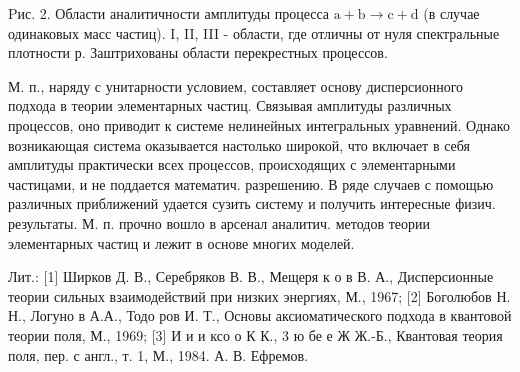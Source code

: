 \documentclass[10pt]{article}
\begin{document}
Pис. 2. Области аналитичности амплитуды процесса $\mathrm{a}+\mathrm{b} \rightarrow \mathrm{c}+\mathrm{d}$ (в случае одинаковых масс частиц). I, II, III - области, где отличны от нуля спектральные плотности р. Заштрихованы области перекрестных процессов.



М. п., наряду с унитарности условием, составляет основу дисперсионного подхода в теории элементарных частиц. Связывая амплитуды различных процессов, оно приводит к системе нелинейных интегральных уравнений. Однако возникающая система оказывается настолько широкой, что включает в себя амплитуды практически всех процессов, происходящих с элементарными частицами, и не поддается математич. разрешению. В ряде случаев с помощью различных приближений удается сузить систему и получить интересные физич. результаты. М. п. прочно вошло в арсенал аналитич. методов теории элементарных частиц и лежит в основе многих моделей.



Лит.: [1] Ширков Д. В., Серебряков В. В., Мещеря к о в В. А., Дисперсионные теории сильных взаимодействий при низких энергиях, М., 1967; [2] Боголюбов Н. Н., Логуно в А.А., Тодо ров И. Т., Основы аксиоматического подхода в квантовой теории поля, М., 1969; [3] И и и ксо о К К., 3 ю бе е Ж Ж.-Б., Квантовая теория поля, пер. с англ., т. 1, М., 1984. А. В. Ефремов.
\end{document}
